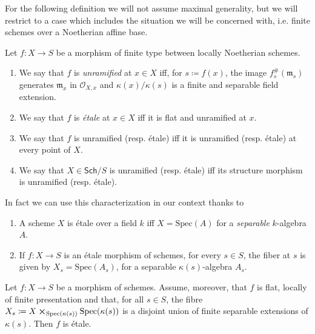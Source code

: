 \noindent
For the following definition we will not assume maximal generality, but
we will restrict to a case which includes the situation we will be concerned with,
i.e. finite schemes over a Noetherian affine base.
\begin{defn}\label{defn:EtaleMorphismSheaves}
	Let $f\colon X \to S$ be a morphism of finite type between
	locally Noetherian schemes.
\begin{enumerate}
	\item We say that $f$ is {\em unramified} at $x \in X$ iff, for $s \coloneqq f(x)$,
		the image $f^{\#}_s(\mathfrak{m}_s)$ generates
		$\mathfrak{m}_x$ in $\mathcal{O}_{ X,x }$
		and $\kappa(x)/\kappa(s)$ is a finite and separable field extension.

	\item We say that $f$ is {\em étale} at $x \in X$ iff it is
		flat and unramified at $x$.

	\item We say that $f$ is unramified (resp$.$ étale) iff it is 
		unramified (resp$.$ étale) at every point of $X$.

	\item We say that $X \in \mathsf{Sch}/S$ is unramified 
		(resp$.$ étale) iff its structure
		morphism is unramified (resp$.$ étale).
\end{enumerate}
\end{defn}


\noindent
In fact we can use this characterization in our context thanks to
\begin{lem}
	\leavevmode\vspace{-.2\baselineskip}
\begin{enumerate}
	\item A scheme $X$ is étale over a field $k$ iff $X = \mathrm{Spec}(A)$
		for a {\em separable} $k$-algebra $A$.
	\item If $f\colon X \to S$ is an étale morphism of schemes,
		for every $s \in S$, the fiber at $s$ is given by $X_s = \mathrm{Spec}(A_s)$,
		for a separable $\kappa(s)$-algebra $A_s$.
\end{enumerate}
\end{lem} 


\begin{lem}
	\label{FlatMorphismEtaleViaFIbers}
	Let $f\colon X \to S$ be a morphism of schemes.
	Assume, moreover, that $f$ is flat, locally of finite presentation and that,
	for all $s \in S$, the fibre $X_s \coloneqq 
	X \cross_{\mathrm{Spec}(\kappa(s))} \mathrm{Spec}(\kappa(s))$
	is a disjoint union of finite separable extensions of $\kappa(s)$.
	Then $f$ is étale.
\end{lem} 


